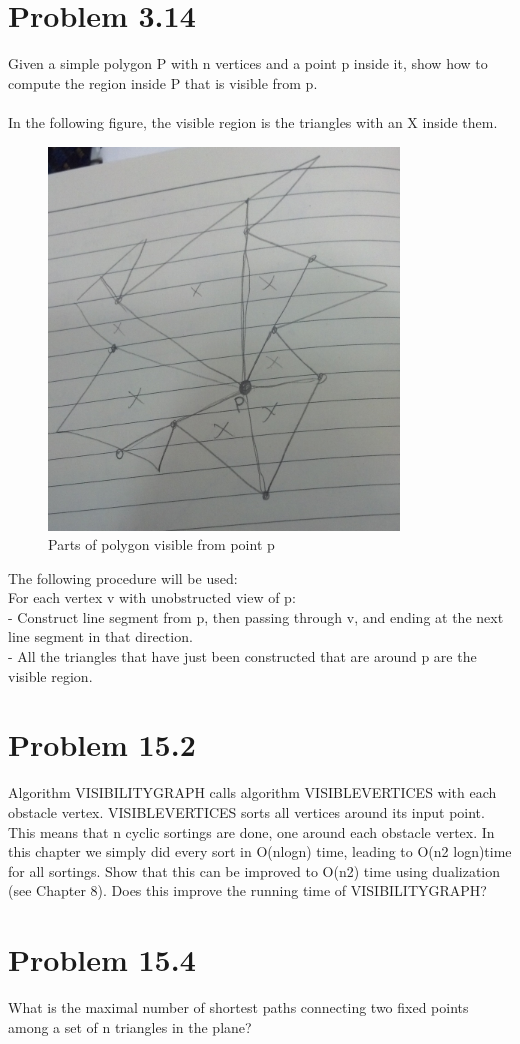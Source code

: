 \documentclass[11pt,psfig]{article}
\begin{document}
\newpage

\section*{Problem 3.14}

Given a simple polygon P with n vertices and a point p inside it, show
how to compute the region inside P that is visible from p.\\
\\
In the following figure, the visible region is the triangles with an X inside them. \\
\begin{figure}[H]
\centering
\includegraphics[height=4in]{visible_regions.jpg}
\caption{Parts of polygon visible from point p}
\end{figure}

The following procedure will be used:\\
For each vertex v with unobstructed view of p:\\
- Construct line segment from p, then passing through v, and ending at the next line segment in that direction. \\
- All the triangles that have just been constructed that are around p are the visible region. 

\newpage

\section*{Problem 15.2}

Algorithm VISIBILITYGRAPH calls algorithm VISIBLEVERTICES with
each obstacle vertex. VISIBLEVERTICES sorts all vertices around its
input point. This means that n cyclic sortings are done, one around each
obstacle vertex. In this chapter we simply did every sort in O(nlogn)
time, leading to O(n2 logn)time for all sortings. Show that this can be
improved to O(n2) time using dualization (see Chapter 8). Does this
improve the running time of VISIBILITYGRAPH?

\newpage

\section*{Problem 15.4}

What is the maximal number of shortest paths connecting two ﬁxed
points among a set of n triangles in the plane?
\end{document}
